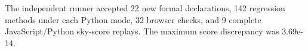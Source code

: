 The independent runner accepted 22 new formal declarations, 142 regression methods under each Python mode, 32 browser checks, and 9 complete JavaScript/Python sky-score replays. The maximum score discrepancy was 3.69e-14.
